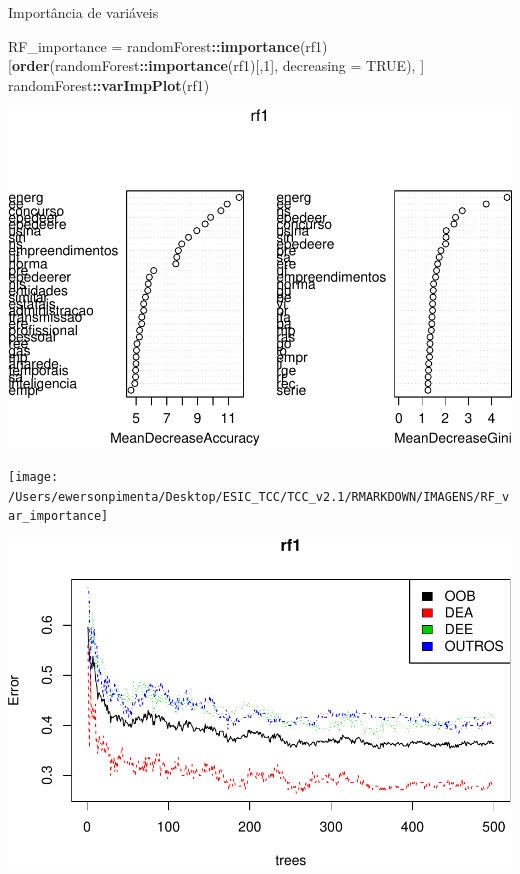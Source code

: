 \documentclass[]{article}
\newenvironment{Shaded}{\begin{snugshade}}{\end{snugshade}}
\newcommand{\KeywordTok}[1]{\textcolor[rgb]{0.13,0.29,0.53}{\textbf{#1}}}
\newcommand{\DataTypeTok}[1]{\textcolor[rgb]{0.13,0.29,0.53}{#1}}
\newcommand{\DecValTok}[1]{\textcolor[rgb]{0.00,0.00,0.81}{#1}}
\newcommand{\StringTok}[1]{\textcolor[rgb]{0.31,0.60,0.02}{#1}}
\newcommand{\OtherTok}[1]{\textcolor[rgb]{0.56,0.35,0.01}{#1}}
\newcommand{\OperatorTok}[1]{\textcolor[rgb]{0.81,0.36,0.00}{\textbf{#1}}}
\newcommand{\NormalTok}[1]{#1}
\begin{document}
Importância de variáveis

\begin{Shaded}
\begin{Highlighting}[]
\NormalTok{RF_importance =}\StringTok{ }\NormalTok{randomForest}\OperatorTok{::}\KeywordTok{importance}\NormalTok{(rf1)[}\KeywordTok{order}\NormalTok{(randomForest}\OperatorTok{::}\KeywordTok{importance}\NormalTok{(rf1)[,}\DecValTok{1}\NormalTok{], }\DataTypeTok{decreasing =} \OtherTok{TRUE}\NormalTok{), ]}
\NormalTok{randomForest}\OperatorTok{::}\KeywordTok{varImpPlot}\NormalTok{(rf1)}
\end{Highlighting}
\end{Shaded}

\includegraphics{markdown_v42_files/figure-latex/unnamed-chunk-85-1.pdf}

\texttt{[image: /Users/ewersonpimenta/Desktop/ESIC\_TCC/TCC\_v2.1/RMARKDOWN/IMAGENS/RF\_var\_importance]}

\begin{Shaded}
\end{Shaded}

\includegraphics{markdown_v42_files/figure-latex/unnamed-chunk-87-1.pdf}
\end{document}
